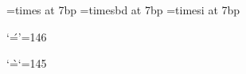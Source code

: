 





\font\sevenrm=times at 7bp
\font\sevenbf=timesbd at 7bp
\font\sevensl=timesi at 7bp

% 
% 




\def\LaTeX{%
  \setbox0\hbox{T}%
  \dimen0=\ht0
  L\kern-.3em%
  \setbox2\hbox{%
  \sevenrm A}%
  \advance\dimen0-\ht2
  \raise\dimen0\box2
  \kern-.15em%
  \TeX
  \null}

\def\LaTeXbf{%
  \setbox0\hbox{T}%
  \dimen0=\ht0
  L\kern-.25em%
  \setbox2\hbox{%
  \sevenbf A}%
  \advance\dimen0-\ht2
  \raise\dimen0\box2
  \kern-.13em%
  \TeX
  \null}

\def\LaTeXsl{
  {\sl
  \setbox0\hbox{T}%
  \dimen0=\ht0
  L\kern-.2em%
  \setbox2\hbox{%
  \sevensl A}%
  \advance\dimen0-\ht2
  \raise\dimen0\box2
  \kern-.1em%
  \TeX
  \null}}

\def\Y&Y{Y\kern-.2em{\sevenrm \&}\kern-.2emY}



\catcode`\'=\active \chardef'=146


\catcode`\`=\active \chardef`=145

\overfullrule=1pt	%

